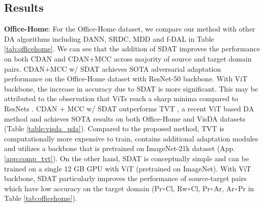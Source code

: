 \documentclass[table,dvipsnames]{article}
\newcommand{\veryshortarrow}[1][3pt]{\mathrel{\hbox{\rule[\dimexpr\fontdimen22\textfont2-.2pt\relax]{#1}{.4pt}}\mkern-4mu\hbox{\usefont{U}{lasy}{m}{n}\symbol{41}}}} \newcommand{\cmark}{\ding{51}}\newcommand{\xmark}{\ding{55}}\usepackage{amssymb}\usepackage{pifont}\usepackage[hyphens]{url}
\theoremstyle{plain}
\theoremstyle{definition}
\theoremstyle{remark}
\begin{document}
\subsection{Results}




\textbf{Office-Home}: For the Office-Home dataset, we compare our method with other DA algorithms including DANN, SRDC, MDD and f-DAL in Table \ref{tab:officehome}.
We can see that the addition of SDAT improves the performance on both CDAN and CDAN+MCC across majority of source and target domain pairs. CDAN+MCC w/ SDAT achieves SOTA adversarial adaptation performance on the Office-Home dataset with ResNet-50 backbone. With ViT backbone, the increase in accuracy due to SDAT is more significant. This may be attributed to the observation that ViTs reach a sharp minima compared to ResNets \cite{chen2021vision}. CDAN + MCC w/ SDAT outperforms TVT \cite{yang2021tvt}, a recent ViT based DA method and achieves SOTA results on both Office-Home and VisDA datasets (Table \ref{table:visda_uda}). Compared to the proposed method, TVT is computationally more expensive to train, contains additional adaptation modules and utilizes a backbone that is pretrained on ImageNet-21k dataset (App. \ref{app:comp_tvt}). On the other hand, SDAT is conceptually simple and can be trained on a single 12 GB GPU with ViT (pretrained on ImageNet). 
With ViT backbone, SDAT particularly improves the performance of source-target pairs which have low accuracy on the target domain (Pr$\veryshortarrow$Cl, Rw$\veryshortarrow$Cl, Pr$\veryshortarrow$Ar, Ar$\veryshortarrow$Pr in Table \ref{tab:officehome}). 
\end{document}
